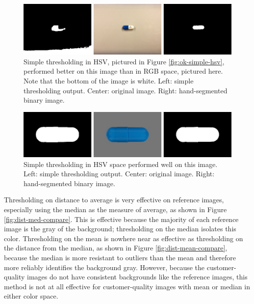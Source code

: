 \documentclass{article}
\begin{document}
\begin{figure}
    \includegraphics[width=\linewidth]{images/simple_rgb_ok.jpg}
    \caption{Simple thresholding in HSV, pictured in Figure \ref{fig:ok-simple-hsv}, performed better on this image than in RGB space, pictured here. Note that the bottom of the image is white. Left: simple thresholding output. Center: original image. Right: hand-segmented binary image.}
    \label{fig:ok-simple-rgb}
\end{figure}

\begin{figure}
    \includegraphics[width=\linewidth]{images/simple_hsv_good.jpg}
    \caption{Simple thresholding in HSV space performed well on this image. Left: simple thresholding output. Center: original image. Right: hand-segmented binary image.}
    \label{fig:good-simple-hsv}
\end{figure}

Thresholding on distance to average is very effective on reference images, especially using the median as the measure of average, as shown in Figure \ref{fig:dist-med-compare}. This is effective because the majority of each reference image is the gray of the background; thresholding on the median isolates this color. Thresholding on the mean is nowhere near as effective as thresholding on the distance from the median, as shown in Figure \ref{fig:dist-mean-compare}, because the median is more resistant to outliers than the mean and therefore more reliably identifies the background gray. However, because the customer-quality images do not have consistent backgrounds like the reference images, this method is not at all effective for customer-quality images with mean or median in either color space. 
\end{document}
